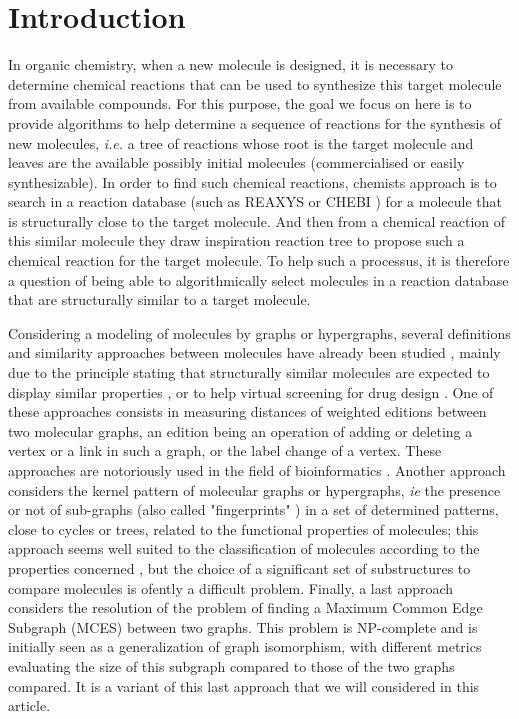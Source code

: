 \documentclass[journal=jacsat,manuscript=article]{achemso}
\begin{document}

\section{Introduction}

In organic chemistry, when a new molecule is designed, it is necessary to determine chemical reactions that can be used to synthesize this target molecule from available compounds.  For this purpose, the goal we focus on here is to provide algorithms to help determine a sequence of reactions for the synthesis of new molecules,\textit{ i.e.} a tree of reactions whose root is the target molecule and  leaves are the available possibly initial molecules (commercialised or easily synthesizable).  In order to find such chemical reactions, chemists approach is to search in a reaction database (such as REAXYS \cite{reaxys} or CHEBI \cite{chebi}) for a molecule that is structurally close to the target molecule. And then from a chemical reaction of this similar molecule they draw inspiration reaction tree to propose such a chemical reaction for the target molecule. To help such a processus, it is therefore a question of being able to algorithmically select molecules in a reaction database that are structurally similar to a target molecule.

Considering a modeling of molecules by graphs or hypergraphs, several definitions and similarity approaches between molecules have already been studied \cite{Raymond2002}, mainly due to the principle stating that structurally similar molecules are expected to display similar properties \cite{Zager2008,Johnson1990},  or to help virtual screening for drug design  \cite{Eckert2007}. One of these approaches consists in  measuring distances of weighted editions between two molecular graphs, an edition being an operation of adding or deleting a vertex or a link in such a graph, or the label change of a vertex. These approaches are notoriously used in the field of bioinformatics \cite{Neuhaus2007,Sayle2015}. Another approach considers the kernel pattern of molecular graphs or hypergraphs, \textit{ie} the presence or not of sub-graphs (also called "fingerprints" \cite{Cereto2015,Bender2009}) in a set of determined patterns, close to cycles or trees, related to the functional properties of molecules; this approach seems well suited to the classification of molecules according to the properties concerned \cite{Grave2010,Gauzere2015}, but the choice of a significant set of substructures to compare molecules is ofently a difficult problem. Finally, a last approach considers the resolution of the problem of finding a Maximum Common Edge Subgraph\cite{Raymond2002}  (MCES) between two graphs. This problem is NP-complete and is initially seen as a generalization of graph isomorphism, with different metrics evaluating the size of this subgraph compared to those of the two graphs compared\cite{Faisal2007,Eckert2007,Zager2008,Akutsu2013}. It is a variant of this last approach that we will considered in this article.
\end{document}
